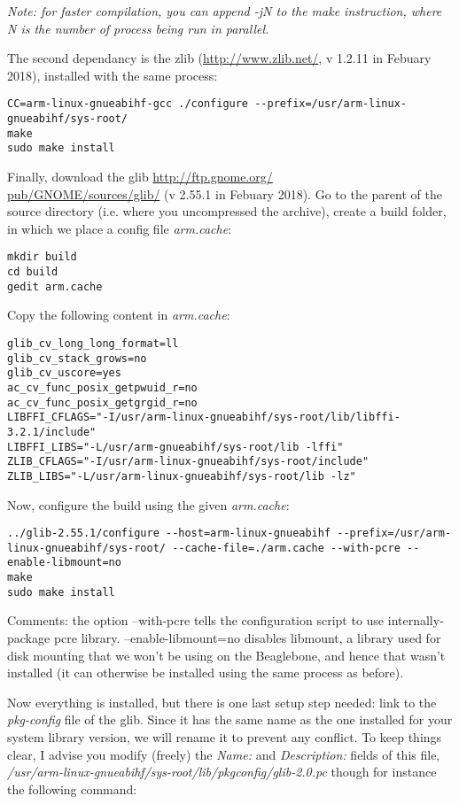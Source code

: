 \documentclass[a4paper,11pt]{article}
\begin{document}
\emph{Note: for faster compilation, you can append \emph{-jN} to the make instruction, where N is the number of process being run in parallel.}

The second dependancy is the zlib (\href{http://www.zlib.net/}{http://www.zlib.net/}, v 1.2.11 in Febuary 2018), installed with the same process:
\begin{lstlisting}[]
CC=arm-linux-gnueabihf-gcc ./configure --prefix=/usr/arm-linux-gnueabihf/sys-root/
make
sudo make install
\end{lstlisting}

Finally, download the glib \href{http://ftp.gnome.org/pub/GNOME/sources/glib/}{http://ftp.gnome.org/\\pub/GNOME/sources/glib/} (v 2.55.1 in Febuary 2018). Go to the parent of the source directory (i.e. where you uncompressed the archive), create a build folder, in which we place a config file \emph{arm.cache}:

\begin{lstlisting}
mkdir build
cd build
gedit arm.cache
\end{lstlisting}

Copy the following content in \emph{arm.cache}:
\begin{lstlisting}[caption= File arm.cache]
glib_cv_long_long_format=ll
glib_cv_stack_grows=no
glib_cv_uscore=yes
ac_cv_func_posix_getpwuid_r=no
ac_cv_func_posix_getgrgid_r=no
LIBFFI_CFLAGS="-I/usr/arm-linux-gnueabihf/sys-root/lib/libffi-3.2.1/include"
LIBFFI_LIBS="-L/usr/arm-gnueabihf/sys-root/lib -lffi"
ZLIB_CFLAGS="-I/usr/arm-linux-gnueabihf/sys-root/include"
ZLIB_LIBS="-L/usr/arm-linux-gnueabihf/sys-root/lib -lz"
\end{lstlisting}

Now, configure the build using the given \emph{arm.cache}:

\begin{lstlisting}[]
../glib-2.55.1/configure --host=arm-linux-gnueabihf --prefix=/usr/arm-linux-gnueabihf/sys-root/ --cache-file=./arm.cache --with-pcre --enable-libmount=no
make
sudo make install
\end{lstlisting}

Comments: the option --with-pcre tells the configuration script to use internally-package pcre library. --enable-libmount=no disables libmount, a library used for disk mounting that we won't be using on the Beaglebone, and hence that wasn't installed (it can otherwise be installed using the same process as before).

Now everything is installed, but there is one last setup step needed: link to the \emph{pkg-config} file of the glib. Since it has the same name as the one installed for your system library version, we will rename it to prevent any conflict. To keep things clear, I advise you modify (freely) the \emph{Name:} and \emph{Description:} fields of this file, \emph{/usr/arm-linux-gnueabihf/sys-root/lib/pkgconfig/glib-2.0.pc} though for instance the following command:
\end{document}
